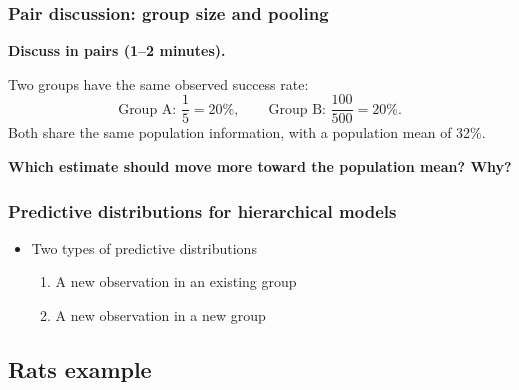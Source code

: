\documentclass[10pt]{beamer}
\begin{document}
\begin{frame}
\frametitle{Pair discussion: group size and pooling}

  {\color{uured}\textbf{Discuss in pairs (1--2 minutes).}}

  Two groups have the same observed success rate:
  \[
    \text{Group A: }\frac{1}{5}=20\%,\qquad
    \text{Group B: }\frac{100}{500}=20\%.
  \]
  Both share the same population information, with a population
  mean of 32\%.

  \textbf{Which estimate should move more toward the population mean?
    Why?}

\end{frame}

\begin{frame}
\frametitle{Predictive distributions for hierarchical models}

  \begin{itemize}
    \item Two types of predictive distributions
    \begin{enumerate}
      \item A new observation in {\color{uured} an existing group}
      \item A new observation in {\color{uured} a new group}
    \end{enumerate}
        \begin{xy}
        \end{xy}
  \end{itemize}
\end{frame}

\subsection{Rats example}
\end{document}
